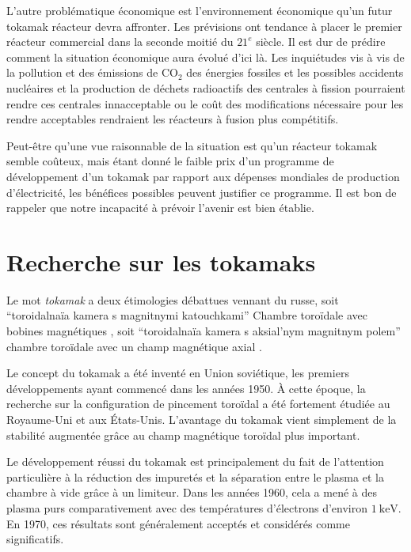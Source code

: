 \documentclass[main.tex]{subfiles}
\begin{document}
L'autre problématique économique est l'environnement économique qu'un futur tokamak réacteur devra affronter.
Les prévisions ont tendance à placer le premier réacteur commercial dans la seconde moitié du \( 21^e \) siècle.
Il est dur de prédire comment la situation économique aura évolué d'ici là.
Les inquiétudes vis à vis de la pollution et des émissions de \( \text{CO}_2 \) des énergies fossiles et les possibles accidents nucléaires et la production de déchets radioactifs des centrales à fission pourraient rendre ces centrales innacceptable ou le coût des modifications nécessaire pour les rendre acceptables rendraient les réacteurs à fusion  plus compétitifs.

Peut-être qu'une vue raisonnable de la situation est qu'un réacteur tokamak semble coûteux, mais étant donné le faible prix d'un programme de développement d'un tokamak par rapport aux dépenses mondiales de production d'électricité, les bénéfices possibles peuvent justifier ce programme.
Il est bon de rappeler que notre incapacité  à prévoir l'avenir est bien établie.

\FloatBarrier
\section{Recherche sur les tokamaks}
\label{sec:recherhce_tokamak}

Le mot \textit{tokamak} a deux étimologies débattues vennant du russe, soit 
``toroidalnaïa kamera s magnitnymi katouchkami'' Chambre toroïdale avec bobines magnétiques%
, soit 
``toroidalnaïa kamera s aksial'nym magnitnym polem'' chambre toroïdale avec un champ magnétique axial%
.

Le concept du tokamak a été inventé en Union soviétique, les premiers développements ayant commencé dans les années 1950.
À cette époque, la recherche sur la configuration de pincement toroïdal a été fortement étudiée au Royaume-Uni et aux États-Unis.
L'avantage du tokamak vient simplement de la stabilité augmentée grâce au champ magnétique toroïdal plus important.

Le développement réussi du tokamak est principalement du fait de l'attention particulière à la réduction des impuretés et la séparation entre le plasma et la chambre à vide grâce à un limiteur.
Dans les années 1960, cela a mené à des plasma purs comparativement avec des températures d'électrons d'environ \( \SI{1}{\kilo\electronvolt} \).
En 1970, ces résultats sont généralement acceptés et considérés comme significatifs.
\end{document}
